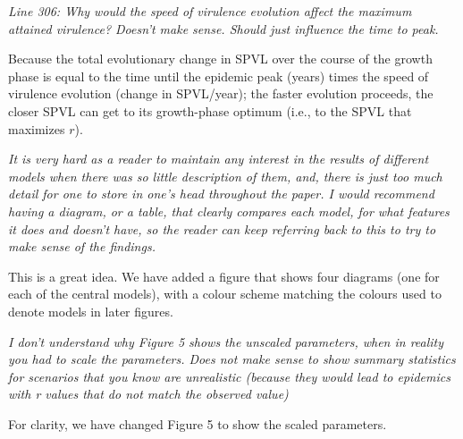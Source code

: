 \documentclass[10pt]{letter}
\newcommand{\revcomment}[1]{\emph{#1}}
\newcommand{\response}[1]{#1}
\begin{document}
\begin{letter}{
}
\revcomment{
Line 306: Why would the speed of virulence evolution affect the maximum attained virulence? Doesn’t make sense. Should just influence the time to peak.
}

\response{
  Because the total evolutionary change in SPVL over the course of the growth phase is
equal to the time until the epidemic peak (years) times the 
speed of virulence evolution (change in SPVL/year); the faster
evolution proceeds, the closer SPVL can get to its growth-phase optimum (i.e., to the
SPVL that maximizes $r$).
}

\revcomment{
It is very hard as a reader to maintain any interest in the results of different models when there was so little description of them, and, there is just too much detail for one to store in one’s head throughout the paper. I would recommend having a diagram, or a table, that clearly compares each model, for what features it does and doesn’t have, so the reader can keep referring back to this to try to make sense of the findings.
}

\response{
This is a great idea.  We have added a figure that shows four diagrams (one for each of the central models), with a colour scheme matching the colours used to denote models in later figures.
}

\revcomment{
I don’t understand why Figure 5 shows the unscaled parameters, when in reality you had to scale the parameters. Does not make sense to show summary statistics for scenarios that you know are unrealistic (because they would lead to epidemics with r values that do not match the observed value)
}

\response{
For clarity, we have changed Figure 5 to show the scaled parameters.
}


\end{letter}
\end{document}

